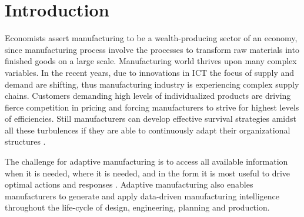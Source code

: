 \chapter{Introduction} \label{chap:introduction}Economists assert manufacturing to be a wealth-producing sector of an economy, since manufacturing process involve the processes to transform raw materials into finished goods on a large scale. Manufacturing world thrives upon many complex variables. In the recent years, due to innovations in \acs{ICT} the focus of supply and demand are shifting, thus manufacturing industry is experiencing complex supply chains. Customers demanding high levels of individualized products are driving fierce competition in pricing and forcing manufacturers to strive for highest levels of efficiencies. Still manufacturers can develop effective survival strategies amidst all these turbulences  if they are able to continuously adapt their organizational structures \cite{WESTKAMP}.

The challenge for adaptive manufacturing is to access all available information when it is needed, where it is needed, and in the form it is most useful to drive optimal actions and responses . Adaptive manufacturing also enables manufacturers to generate and apply data-driven manufacturing intelligence throughout the life-cycle of design, engineering, planning and production.

